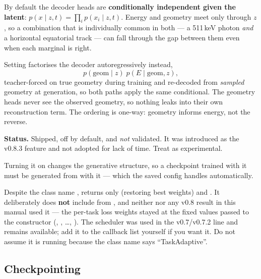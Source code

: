 \documentclass[11pt,a4paper]{article}
\begin{document}
\begin{maginote}
By default the decoder heads are \textbf{conditionally independent given the
latent}: $p(x \mid z,t) = \prod_i p(x_i \mid z,t)$. Energy and geometry meet only
through $z$, so a combination that is individually common in both --- a 511\,keV
photon \emph{and} a horizontal equatorial track --- can fall through the gap
between them even when each marginal is right.

Setting  factorises the decoder
autoregressively instead,
\[
  p(\mathrm{geom} \mid z)\; p(E \mid \mathrm{geom}, z),
\]
teacher-forced on true geometry during training and re-decoded from
\emph{sampled} geometry at generation, so both paths apply the same conditional.
The geometry heads never see the observed geometry, so nothing leaks into their
own reconstruction term. The ordering is one-way: geometry informs energy, not
the reverse.

\textbf{Status.} Shipped, off by default, and \emph{not} validated. It was introduced as the v0.8.3 feature and not adopted for lack of time. Treat  as experimental.

Turning it on changes the generative structure, so a checkpoint trained with it must be generated from with it --- which the saved config handles automatically.
\end{maginote}

\begin{magiwarn}
Despite the class name , 
returns only  (restoring best weights) and
. It deliberately does \textbf{not} include
 from
, and neither
 nor any v0.8 result in this manual used it ---
the per-task loss weights stayed at the fixed values passed to the constructor
(, , \ldots, ). The scheduler was
used in the v0.7/v0.7.2 line and remains available; add it to the callback list
yourself if you want it. Do not assume it is running because the class name
says ``TaskAdaptive''.
\end{magiwarn}

\subsection{Checkpointing}
\end{document}
